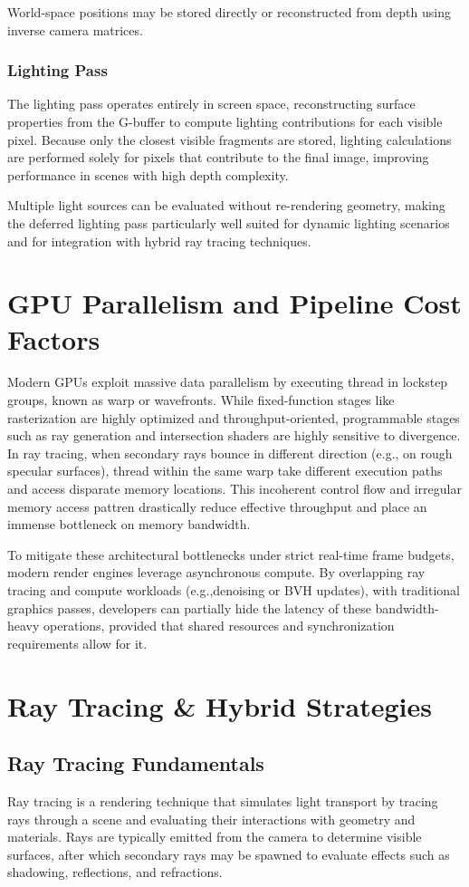 \documentclass[12pt,a4paper]{report}
\newcommand{\daesection}[1]{
  \section{#1}
}
\begin{document}
World-space positions may be stored directly or reconstructed from depth using inverse camera matrices.
\cite{akenine2018realtimerendering, learnopengl}
\subsubsection{Lighting Pass}
The lighting pass operates entirely in screen space, reconstructing surface
properties from the G-buffer to compute lighting contributions for each visible
pixel. Because only the closest visible fragments are stored, lighting
calculations are performed solely for pixels that contribute to the final image,
improving performance in scenes with high depth complexity.

Multiple light sources can be evaluated without re-rendering geometry, making
the deferred lighting pass particularly well suited for dynamic lighting
scenarios and for integration with hybrid ray tracing techniques.

\daesection{GPU Parallelism and Pipeline Cost Factors}

Modern GPUs exploit massive data parallelism by executing thread in lockstep groups, known as warp or wavefronts.
While fixed-function stages like rasterization are highly optimized and throughput-oriented, programmable stages such as ray generation and intersection shaders
are highly sensitive to divergence. In ray tracing, when secondary rays bounce in different direction (e.g., on rough specular surfaces), thread within the same warp take different
execution paths and access disparate memory locations. This incoherent control flow and irregular memory access pattren drastically reduce effective throughput and place an immense 
bottleneck on memory bandwidth.\cite{akenine2018realtimerendering}

To mitigate these architectural bottlenecks under strict real-time frame budgets, modern render engines leverage asynchronous compute.
By overlapping ray tracing and compute workloads (e.g.,denoising or BVH updates), with traditional graphics passes, developers can partially hide
the latency of these bandwidth-heavy operations, provided that shared resources and synchronization requirements allow for it.


\cite{akenine2018realtimerendering}
\daesection{Ray Tracing \& Hybrid Strategies}
\subsection{Ray Tracing Fundamentals}
Ray tracing is a rendering technique that simulates light transport by tracing
rays through a scene and evaluating their interactions with geometry and
materials. Rays are typically emitted from the camera to determine visible
surfaces, after which secondary rays may be spawned to evaluate effects such as
shadowing, reflections, and refractions.
\end{document}

